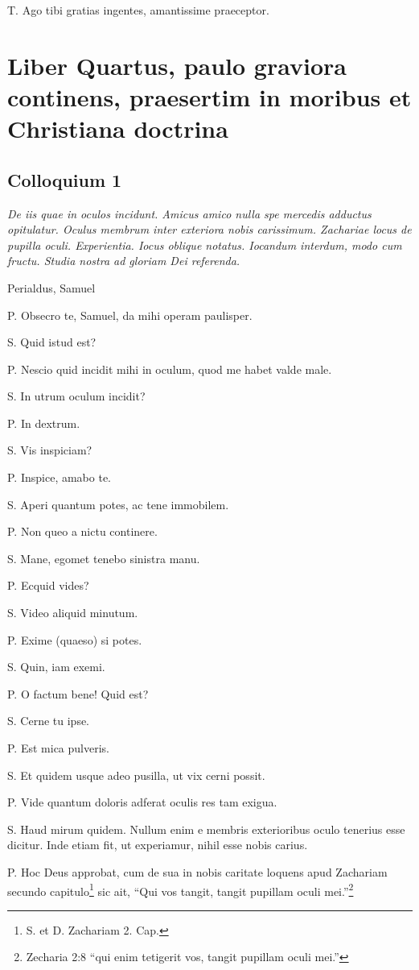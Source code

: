 \documentclass{article}
\begin{document}
T. Ago tibi gratias ingentes, amantissime praeceptor.

\section{Liber Quartus, paulo graviora continens, praesertim in moribus et Christiana doctrina} %
\subsection{Colloquium 1}
\emph{De iis quae in oculos incidunt. Amicus amico nulla spe mercedis adductus opitulatur. Oculus membrum inter exteriora nobis carissimum. Zachariae locus de pupilla oculi. Experientia. Iocus oblique notatus. Iocandum interdum, modo cum fructu. Studia nostra ad gloriam Dei referenda.}

Perialdus, Samuel

P. Obsecro te, Samuel, da mihi operam paulisper.

S. Quid istud est?

P. Nescio quid incidit mihi in oculum, quod me habet valde male.

S. In utrum oculum incidit?

P. In dextrum.

S. Vis inspiciam?

P. Inspice, amabo te.

S. Aperi quantum potes, ac tene immobilem.

P. Non queo a nictu continere.

S. Mane, egomet tenebo sinistra manu.

P. Ecquid vides?

S. Video aliquid minutum.

P. Exime (quaeso) si potes.

S. Quin, iam exemi.

P. O factum bene! Quid est?

S. Cerne tu ipse.

P. Est mica pulveris.

S. Et quidem usque adeo pusilla, ut vix cerni possit.

P. Vide quantum doloris adferat oculis res tam exigua.

S. Haud mirum quidem. Nullum enim e membris exterioribus oculo tenerius esse dicitur. Inde etiam fit, ut experiamur, nihil esse nobis carius.

P. Hoc Deus approbat, cum de sua in nobis caritate loquens apud Zachariam secundo capitulo\footnote{S. et D. Zachariam 2. Cap.} sic ait, “Qui vos tangit, tangit pupillam oculi mei.''\footnote{Zecharia 2:8 ``qui enim tetigerit vos, tangit pupillam oculi mei.''}
\end{document}
